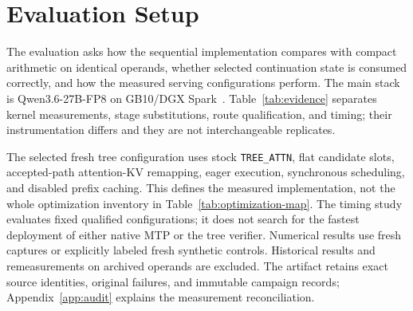 \documentclass[conference]{IEEEtran}
\begin{document}
\section{Evaluation Setup}
\label{sec:protocol}
The evaluation asks how the sequential implementation compares with compact arithmetic on identical operands, whether selected continuation state is consumed correctly, and how the measured serving configurations perform. The main stack is Qwen3.6-27B-FP8 on GB10/DGX Spark~\cite{qwen2026qwen36fp8,lumo2026archive}. Table~\ref{tab:evidence} separates kernel measurements, stage substitutions, route qualification, and timing; their instrumentation differs and they are not interchangeable replicates.

The selected fresh tree configuration uses stock \texttt{TREE\_ATTN}, flat candidate slots, accepted-path attention-KV remapping, eager execution, synchronous scheduling, and disabled prefix caching. This defines the measured implementation, not the whole optimization inventory in Table~\ref{tab:optimization-map}. The timing study evaluates fixed qualified configurations; it does not search for the fastest deployment of either native MTP or the tree verifier. Numerical results use fresh captures or explicitly labeled fresh synthetic controls. Historical results and remeasurements on archived operands are excluded. The artifact retains exact source identities, original failures, and immutable campaign records; Appendix~\ref{app:audit} explains the measurement reconciliation.
\end{document}
